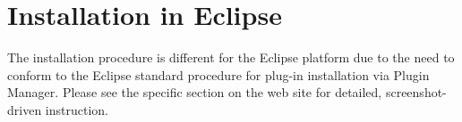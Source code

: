 \section{Installation in Eclipse}

The installation procedure is different for the Eclipse platform due to the need to conform to the Eclipse standard procedure for plug-in installation via Plugin Manager. 
Please see the specific section on the \tuprolog{} web site for detailed, screenshot-driven instruction. 